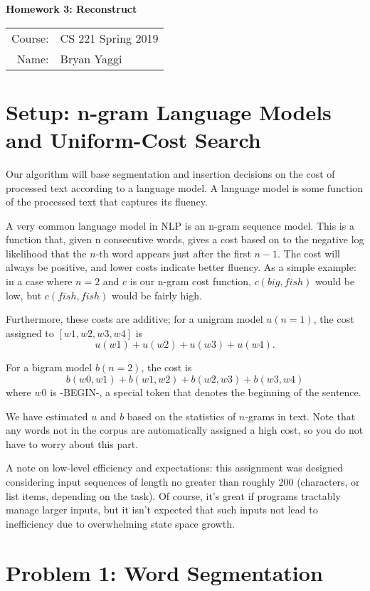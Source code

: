 \documentclass[10pt]{article}
\begin{document}
\begin{center}
{\Large \textbf{Homework 3: Reconstruct}}

\begin{tabular}{rl}
\\
Course: & CS 221 Spring 2019 \\
Name: & Bryan Yaggi
\end{tabular}
\end{center}

\section*{\normalsize Setup: n-gram Language Models and Uniform-Cost Search}

 Our algorithm will base segmentation and insertion decisions on the cost of processed text according to a language model. A language model is some function of the processed text that captures its fluency.
\smallskip

A very common language model in NLP is an n-gram sequence model. This is a function that, given n consecutive words, gives a cost based on to the negative log likelihood that the $n$-th word appears just after the first $n−1$. The cost will always be positive, and lower costs indicate better fluency. As a simple example: in a case where $n=2$ and $c$ is our n-gram cost function, $c(big, fish)$ would be low, but $c(fish, fish)$ would be fairly high.
\smallskip

Furthermore, these costs are additive; for a unigram model $u(n=1)$, the cost assigned to $[w1, w2, w3, w4]$ is
$$u(w1)+u(w2)+u(w3)+u(w4).$$

For a bigram model $b(n=2)$, the cost is
$$b(w0,w1)+b(w1,w2)+b(w2,w3)+b(w3,w4)$$
where $w0$ is -BEGIN-, a special token that denotes the beginning of the sentence.
\smallskip

We have estimated $u$ and $b$ based on the statistics of $n$-grams in text. Note that any words not in the corpus are automatically assigned a high cost, so you do not have to worry about this part.
\smallskip

A note on low-level efficiency and expectations: this assignment was designed considering input sequences of length no greater than roughly 200 (characters, or list items, depending on the task). Of course, it's great if programs tractably manage larger inputs, but it isn't expected that such inputs not lead to inefficiency due to overwhelming state space growth. 

\section*{\normalsize Problem 1: Word Segmentation}
\end{document}
